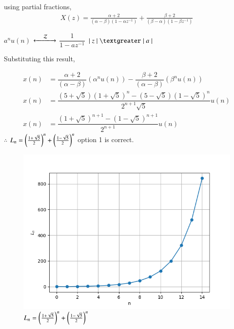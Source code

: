 \documentclass[journal,12pt,twocolumn]{IEEEtran}
\theoremstyle{remark}
\begin{document}
	\vspace{0.4cm}
 using partial fractions,
 \begin{align}
     X(z)=\frac{\alpha+2}{(\alpha-\beta)(1-\alpha z^{-1})}+\frac{\beta+2}{(\beta-\alpha)(1-\beta z^{-1})}
 \end{align}
 
	$a^n u(n)$
	$\xleftarrow[]{\hspace{0.4cm}{\mathcal{Z}}\hspace{0.1cm}}\xrightarrow[]{}$
	$\dfrac{1}{1 - a z^{-1}}$ \hspace{0.2cm} $\lvert \hspace{0.1cm} z \hspace{0.1cm}\rvert \hspace{0.1cm} \textgreater \hspace{0.1cm} \lvert \hspace{0.1cm} a \hspace{0.1cm} \rvert$
	
	\vspace{0.4cm}
	
	Substituting this result,
	
	\vspace{-0.5cm}
	
	\begin{align}
		x(n) &= \dfrac{\alpha+2}{(\alpha - \beta)} (\alpha^n u(n)) - \dfrac{\beta+2}{(\alpha - \beta)} (\beta^n u(n))\\
	    x(n) &= \dfrac{(5+\sqrt{5})(1 + \sqrt{5})^{n} - (5-\sqrt{5})(1 - \sqrt{5})^{n} }{2^{n+1} \sqrt{5}} u(n)\\
    	x(n) &= \dfrac{(1 + \sqrt{5})^{n+1} -(1 - \sqrt{5})^{n+1} }{2^{n+1}} u(n)
    \end{align}
$\therefore$ $L_{n} =\left(\frac{1+\sqrt{5}}{2}\right)^n+\left(\frac{1-\sqrt{5}}{2}\right)^n$
option 1 is correct.
\newpage
\begin{figure}[h]
  \centering
  \includegraphics[width=\columnwidth]{figs/fig1.png}
  \caption{$L_{n}=\left(\frac{1+\sqrt{5}}{2}\right)^n+\left(\frac{1-\sqrt{5}}{2}\right)^n$}
  \label{fig:graph}
\end{figure}
\end{document}
